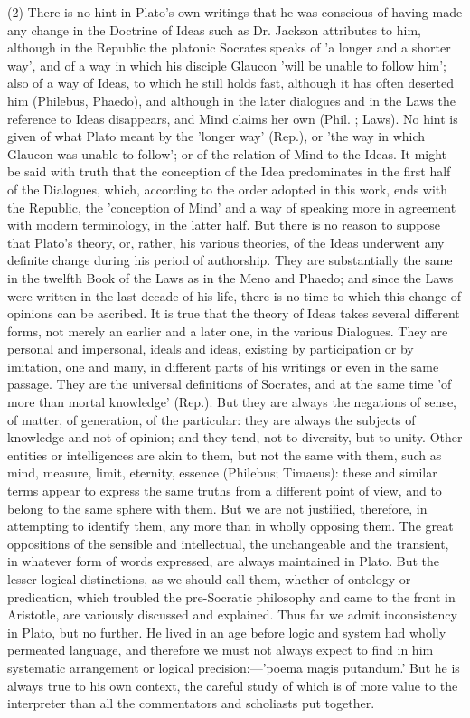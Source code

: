 \documentclass[11pt,letter]{article}
\begin{document}
\par  (2) There is no hint in Plato's own writings that he was conscious of having made any change in the Doctrine of Ideas such as Dr. Jackson attributes to him, although in the Republic the platonic Socrates speaks of 'a longer and a shorter way', and of a way in which his disciple Glaucon 'will be unable to follow him'; also of a way of Ideas, to which he still holds fast, although it has often deserted him (Philebus, Phaedo), and although in the later dialogues and in the Laws the reference to Ideas disappears, and Mind claims her own (Phil. ; Laws). No hint is given of what Plato meant by the 'longer way' (Rep.), or 'the way in which Glaucon was unable to follow'; or of the relation of Mind to the Ideas. It might be said with truth that the conception of the Idea predominates in the first half of the Dialogues, which, according to the order adopted in this work, ends with the Republic, the 'conception of Mind' and a way of speaking more in agreement with modern terminology, in the latter half. But there is no reason to suppose that Plato's theory, or, rather, his various theories, of the Ideas underwent any definite change during his period of authorship. They are substantially the same in the twelfth Book of the Laws as in the Meno and Phaedo; and since the Laws were written in the last decade of his life, there is no time to which this change of opinions can be ascribed. It is true that the theory of Ideas takes several different forms, not merely an earlier and a later one, in the various Dialogues. They are personal and impersonal, ideals and ideas, existing by participation or by imitation, one and many, in different parts of his writings or even in the same passage. They are the universal definitions of Socrates, and at the same time 'of more than mortal knowledge' (Rep.). But they are always the negations of sense, of matter, of generation, of the particular: they are always the subjects of knowledge and not of opinion; and they tend, not to diversity, but to unity. Other entities or intelligences are akin to them, but not the same with them, such as mind, measure, limit, eternity, essence (Philebus; Timaeus): these and similar terms appear to express the same truths from a different point of view, and to belong to the same sphere with them. But we are not justified, therefore, in attempting to identify them, any more than in wholly opposing them. The great oppositions of the sensible and intellectual, the unchangeable and the transient, in whatever form of words expressed, are always maintained in Plato. But the lesser logical distinctions, as we should call them, whether of ontology or predication, which troubled the pre-Socratic philosophy and came to the front in Aristotle, are variously discussed and explained. Thus far we admit inconsistency in Plato, but no further. He lived in an age before logic and system had wholly permeated language, and therefore we must not always expect to find in him systematic arrangement or logical precision:—'poema magis putandum.' But he is always true to his own context, the careful study of which is of more value to the interpreter than all the commentators and scholiasts put together.
\end{document}
